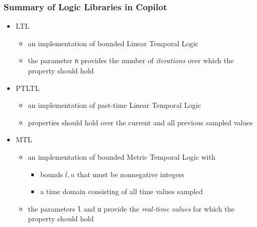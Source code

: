 \documentclass{beamer}
\begin{document}
\begin{frame}
\frametitle{Summary of Logic Libraries in Copilot}
\begin{itemize}
\item LTL
  \begin{itemize}
  \item an implementation of bounded Linear Temporal Logic
  \item the parameter \texttt{n} provides the number of \emph{iterations} over which
  the property should hold
  \end{itemize}
\item PTLTL
  \begin{itemize}
  \item an implementation of past-time Linear Temporal Logic
  \item properties should hold over the current and all previous sampled values
  \end{itemize}
\item MTL
  \begin{itemize}
  \item an implementation of bounded Metric Temporal Logic with
    \begin{itemize}
    \item bounds $l,u$ that must be nonnegative integers
    \item a time domain consisting of all time values sampled
    \end{itemize}
  \item the parameters \texttt{l} and \texttt{u} provide the \emph{real-time values}
  for which the property should hold
  \end{itemize}
\end{itemize}
\end{frame}
\end{document}
